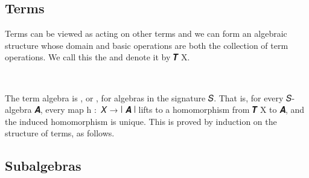 \documentclass[a4paper,UKenglish,cleveref,autoref,thm-restate]{lipics-v2021}
\begin{document}
\subsection{Terms}\label{ssec:terms}
Terms can be viewed as acting on other terms and we can form an algebraic structure whose domain and basic operations are both the collection of term operations. We call this the  and denote it by \af 𝑻 \ab X.
\ccpad
\begin{code}%
\>[0]\AgdaSpace{}%
\AgdaSymbol{:}\AgdaSpace{}%
\AgdaSymbol{\{}\AgdaSpace{}%
\AgdaSymbol{:}\AgdaSpace{}%
\AgdaSymbol{\}(}\AgdaSpace{}%
\AgdaSymbol{:}\AgdaSpace{}%
\AgdaSpace{}%
\AgdaSymbol{)}\AgdaSpace{}%
\AgdaSpace{}%
\AgdaSpace{}%
\AgdaSymbol{(}\AgdaSpace{}%
\AgdaSpace{}%
\AgdaSpace{}%
\AgdaSpace{}%
\AgdaSpace{}%
\AgdaSymbol{)}\AgdaSpace{}%
\<%
\\
\>[0]\AgdaSpace{}%
\AgdaSymbol{\{}\AgdaSymbol{\}}\AgdaSpace{}%
\AgdaSpace{}%
\AgdaSymbol{=}\AgdaSpace{}%
\AgdaSymbol{\{}\AgdaSymbol{\}\{}\AgdaSymbol{\}}\AgdaSpace{}%
\AgdaOperator{\AgdaInductiveConstructor{,}}\AgdaSpace{}%
\<%
\end{code}


The term algebra is , or , for algebras in the signature 𝑆. That is, for every 𝑆-algebra 𝑨, every map \ab h \as :~\ab 𝑋 \as → \af ∣ \ab 𝑨 \af ∣ lifts to a homomorphism from \af 𝑻 \ab X to \ab 𝑨, and the induced homomorphism is unique. This is proved by induction on the structure of terms, as follows.
\ccpad
\begin{code}%

\end{code}











\subsection{Subalgebras}\label{ssec:subalgebras}
\end{document}
